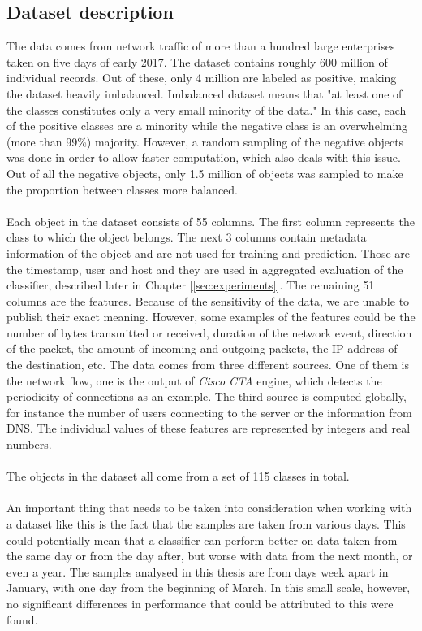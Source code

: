 \documentclass[11pt]{article}
\begin{document}
    \subsection{Dataset description}
      The data comes from network traffic of more than a hundred large enterprises taken on five days of early 2017. The dataset contains roughly 600 million of individual records. Out of these, only 4 million are labeled as positive, making the dataset heavily imbalanced. Imbalanced dataset means that "at least one of the classes constitutes only a very small minority of the data." \cite{imbalanced} In this case, each of the positive classes are a minority while the negative class is an overwhelming (more than 99\%) majority. However, a random sampling of the negative objects was done in order to allow faster computation, which also deals with this issue. Out of all the negative objects, only 1.5 million of objects was sampled to make the proportion between classes more balanced.
      \\~\\
      Each object in the dataset consists of 55 columns. The first column represents the class to which the object belongs. The next 3 columns contain metadata information of the object and are not used for training and prediction. Those are the timestamp, user and host and they are used in aggregated evaluation of the classifier, described later in Chapter [\ref{sec:experiments}]. The remaining 51 columns are the features. Because of the sensitivity of the data, we are unable to publish their exact meaning. However, some examples of the features could be the number of bytes transmitted or received, duration of the network event, direction of the packet, the amount of incoming and outgoing packets, the IP address of the destination, etc. The data comes from three different sources. One of them is the network flow, one is the output of {\it Cisco CTA} engine, which detects the periodicity of connections as an example. The third source is computed globally, for instance the number of users connecting to the server or the information from DNS. The individual values of these features are represented by integers and real numbers.
      \\~\\
      The objects in the dataset all come from a set of 115 classes in total.
      \\~\\
      An important thing that needs to be taken into consideration when working with a dataset like this is the fact that the samples are taken from various days. This could potentially mean that a classifier can perform better on data taken from the same day or from the day after, but worse with data from the next month, or even a year. The samples analysed in this thesis are from days week apart in January, with one day from the beginning of March. In this small scale, however, no significant differences in performance that could be attributed to this were found.
\end{document}
